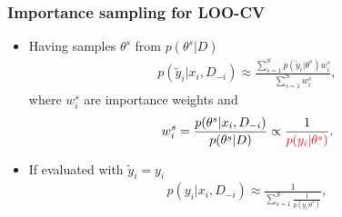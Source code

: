 \documentclass[10pt]{beamer}
\begin{document}
\begin{frame}
  \frametitle{Importance sampling for LOO-CV}

   \begin{itemize}
   \item Having samples $\theta^s$ from $p(\theta^s|D)$
     \begin{align*}
       p(\tilde{y}_i|x_i,D_{-i})\approx\frac{\sum_{s=1}^Sp(\tilde{y}_i|\theta^s)w_i^s}{\sum_{s=1}^S w_i^s},
     \end{align*}
     where $w_i^s$ are importance weights and
     \begin{align*}
       w_i^s=\frac{p(\theta^s|x_i,D_{-i})}{p(\theta^s|D)}\propto\frac{1}{\color{red} p(y_i|\theta^s)}.
     \end{align*}
 \pause
   \item If evaluated with $\tilde{y}_i=y_i$
     \begin{align*}
       p(y_i|x_i,D_{-i})\approx\frac{1}{\sum_{s=1}^S\frac{1}{p(y_i|\theta^s)}},
     \end{align*}
   \end{itemize}

 \end{frame}
\end{document}
